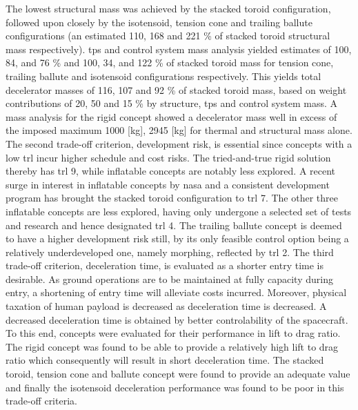 The lowest structural mass was achieved by the stacked toroid configuration, followed upon closely by the isotensoid, tension cone and trailing ballute configurations (an estimated 110, 168 and 221 \% of stacked toroid structural mass respectively). \acrfull{tps} and control system mass analysis yielded estimates of 100, 84, and 76 \% and 100, 34, and 122 \% of stacked toroid mass for tension cone, trailing ballute and isotensoid configurations respectively. This yields total decelerator masses of 116, 107 and 92 \% of stacked toroid mass, based on weight contributions of 20, 50 and 15 \% by structure, \gls{tps} and control system mass. A mass analysis for the rigid concept showed a decelerator mass well in excess of the imposed maximum 1000 [kg], 2945 [kg] for thermal and structural mass alone.
\newline
\newline
The second trade-off criterion, development risk, is essential since concepts with a low \acrfull{trl} incur higher schedule and cost risks. The tried-and-true rigid solution thereby has \gls{trl} 9, while inflatable concepts are notably less explored. A recent surge in interest in inflatable concepts by \gls{nasa} and a consistent development program has brought the stacked toroid configuration to \gls{trl} 7. The other three inflatable concepts are less explored, having only undergone a selected set of tests and research and hence designated \gls{trl} 4. The trailing ballute concept is deemed to have a higher development risk still, by its only feasible control option being a relatively underdeveloped one, namely morphing, reflected by \gls{trl} 2.
\newline
\newline
The third trade-off criterion, deceleration time, is evaluated as a shorter entry time is desirable. As ground operations are to be maintained at fully capacity during entry, a shortening of entry time will alleviate costs incurred. Moreover, physical taxation of human payload is decreased as deceleration time is decreased.  A decreased deceleration time is obtained by better controlability of the spacecraft. To this end, concepts were evaluated for their performance in lift to drag ratio. The rigid concept was found to be able to provide a relatively high lift to drag ratio which consequently will result in short deceleration time. The stacked toroid, tension cone and ballute concept were found to provide an adequate value and finally the isotensoid deceleration performance was found to be poor in this trade-off criteria.
\newline
